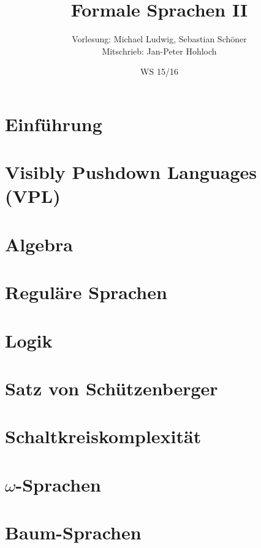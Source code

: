 \documentclass[german,a4paper,10pt]{scrreprt}
\title{Formale Sprachen II}
\author{Vorlesung: Michael Ludwig, Sebastian Schöner\\
Mitschrieb: Jan-Peter Hohloch}
\date{WS 15/16}
\begin{document}
    \maketitle
    \tableofcontents
    \newpage
    \chapter{Einführung}
        
    \chapter{Visibly Pushdown Languages (VPL)}
        
    \chapter{Algebra}
        
    \chapter{Reguläre Sprachen}
        
    \chapter{Logik}
        
    \chapter{Satz von Schützenberger}
        
    \chapter{Schaltkreiskomplexität}
        
    \chapter{$\omega$-Sprachen}
        
    \chapter{Baum-Sprachen}
        
\end{document}
